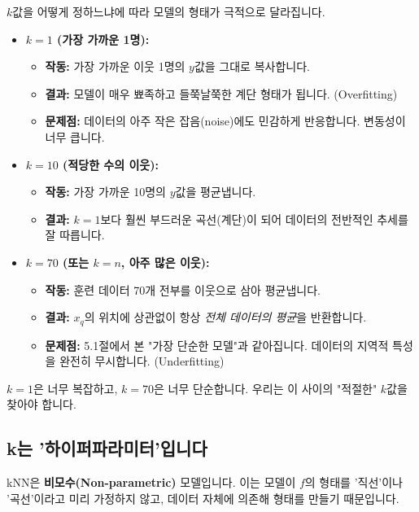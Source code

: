 \documentclass[11pt,a4paper]{book}
\theoremstyle{definition}
\begin{document}
$k$값을 어떻게 정하느냐에 따라 모델의 형태가 극적으로 달라집니다.

\begin{itemize}
    \item \textbf{$k=1$ (가장 가까운 1명):}
        \begin{itemize}
            \item \textbf{작동:} 가장 가까운 이웃 1명의 $y$값을 그대로 복사합니다.
            \item \textbf{결과:} 모델이 매우 뾰족하고 들쭉날쭉한 계단 형태가 됩니다. (Overfitting)
            \item \textbf{문제점:} 데이터의 아주 작은 잡음(noise)에도 민감하게 반응합니다. 변동성이 너무 큽니다.
        \end{itemize}
    \item \textbf{$k=10$ (적당한 수의 이웃):}
        \begin{itemize}
            \item \textbf{작동:} 가장 가까운 10명의 $y$값을 평균냅니다.
            \item \textbf{결과:} $k=1$보다 훨씬 부드러운 곡선(계단)이 되어 데이터의 전반적인 추세를 잘 따릅니다.
        \end{itemize}
    \item \textbf{$k=70$ (또는 $k=n$, 아주 많은 이웃):}
        \begin{itemize}
            \item \textbf{작동:} 훈련 데이터 70개 전부를 이웃으로 삼아 평균냅니다.
            \item \textbf{결과:} $x_q$의 위치에 상관없이 항상 \textit{전체 데이터의 평균}을 반환합니다.
            \item \textbf{문제점:} 5.1절에서 본 "가장 단순한 모델"과 같아집니다. 데이터의 지역적 특성을 완전히 무시합니다. (Underfitting)
        \end{itemize}
\end{itemize}

$k=1$은 너무 복잡하고, $k=70$은 너무 단순합니다. 우리는 이 사이의 "적절한" $k$값을 찾아야 합니다.

\subsection{k는 '하이퍼파라미터'입니다}

kNN은 \textbf{비모수(Non-parametric)} 모델입니다.
이는 모델이 $f$의 형태를 '직선'이나 '곡선'이라고 미리 가정하지 않고, 데이터 자체에 의존해 형태를 만들기 때문입니다.
\end{document}
